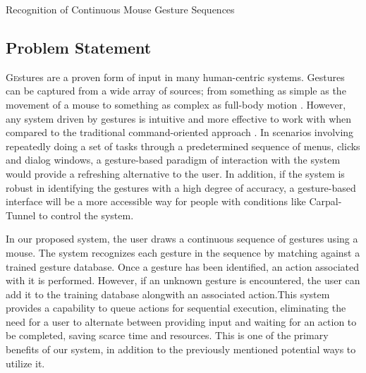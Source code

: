 \documentclass[twoside]{article}
\begin{document}
\centerline{Recognition of Continuous Mouse Gesture Sequences}
\normalsize


\begin{multicols}{2} %

\section{Problem Statement}


\lettrine[nindent=0em,lines=2]{G}estures are a proven form of input in many
human-centric systems. Gestures can be captured from a wide array of sources; from 
something as simple as the movement of a mouse to something as complex as full-body motion \cite{mitra_gesture_2007}.
However, any system driven by gestures is intuitive and more effective to work with
when compared to the traditional command-oriented approach \cite{nielsen_noncommand_1993}. In scenarios involving repeatedly doing a set of tasks through a predetermined sequence of menus, clicks and dialog windows, a gesture-based paradigm of interaction with the system would provide a refreshing alternative to the user. In addition, if the system is robust in identifying the gestures with a high degree of accuracy, a gesture-based interface will be a more accessible way for people with conditions like Carpal-Tunnel to control the system.

In our proposed system, the user draws a continuous sequence of gestures using a mouse. The system recognizes each gesture in the sequence 
by matching against a trained gesture database. Once a gesture has been identified, an action associated with it is performed. However, if an unknown gesture is encountered, the user can add it to the training database alongwith an associated action.This system provides a capability to queue actions for sequential execution, eliminating the need for a user to alternate between providing input and waiting for an action to be completed, saving scarce time and resources. This is one of the primary benefits of our system, in addition to the previously mentioned potential ways to utilize it.


\end{multicols}
\end{document}
